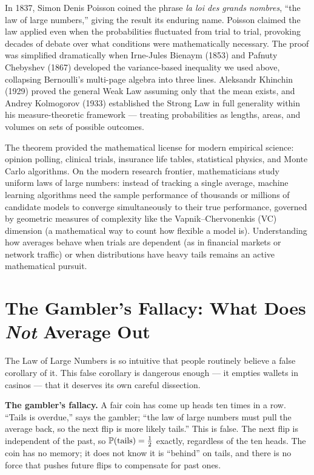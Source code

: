 \begin{historybox}
In 1837, Simon Denis Poisson coined the phrase \emph{la loi des grands nombres}, ``the law of large numbers,'' giving the result its enduring name. Poisson claimed the law applied even when the probabilities fluctuated from trial to trial, provoking decades of debate over what conditions were mathematically necessary. The proof was simplified dramatically when Irne-Jules Bienaym (1853) and Pafnuty Chebyshev (1867) developed the variance-based inequality we used above, collapsing Bernoulli's multi-page algebra into three lines. Aleksandr Khinchin (1929) proved the general Weak Law assuming only that the mean exists, and Andrey Kolmogorov (1933) established the Strong Law in full generality within his measure-theoretic framework --- treating probabilities as lengths, areas, and volumes on sets of possible outcomes.

The theorem provided the mathematical license for modern empirical science: opinion polling, clinical trials, insurance life tables, statistical physics, and Monte Carlo algorithms. On the modern research frontier, mathematicians study uniform laws of large numbers: instead of tracking a single average, machine learning algorithms need the sample performance of thousands or millions of candidate models to converge simultaneously to their true performance, governed by geometric measures of complexity like the Vapnik--Chervonenkis (VC) dimension (a mathematical way to count how flexible a model is). Understanding how averages behave when trials are dependent (as in financial markets or network traffic) or when distributions have heavy tails remains an active mathematical pursuit.
\end{historybox}

\section{The Gambler's Fallacy: What Does \emph{Not} Average Out}
\label{ch20:gambler}

The Law of Large Numbers is so intuitive that people routinely believe a false corollary of it. This false corollary is dangerous enough --- it empties wallets in casinos --- that it deserves its own careful dissection.

\begin{trapbox}
\textbf{The gambler's fallacy.} A fair coin has come up heads ten times in a row. ``Tails is overdue,'' says the gambler; ``the law of large numbers must pull the average back, so the next flip is more likely tails.'' This is false. The next flip is independent of the past, so $\P(\text{tails}) = \tfrac12$ exactly, regardless of the ten heads. The coin has no memory; it does not know it is ``behind'' on tails, and there is no force that pushes future flips to compensate for past ones.
\end{trapbox}

